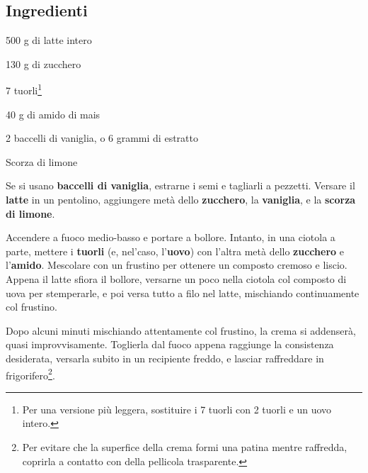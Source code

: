 \newpage
{}

\subsection*{Ingredienti}
\begin{ingredients}
	\item 500 g di latte intero
	\item 130 g di zucchero
	\item 7 tuorli\footnote{Per una versione più leggera, sostituire i 7 tuorli con 2 tuorli e un uovo intero.}
	\item 40 g di amido di mais
	\item 2 baccelli di vaniglia, o 6 grammi di estratto
	\item Scorza di  limone
\end{ingredients}

\medskip

Se si usano \textbf{baccelli di vaniglia}, estrarne i semi e tagliarli a pezzetti.
Versare il \textbf{latte} in un pentolino, aggiungere metà dello \textbf{zucchero}, la \textbf{vaniglia}, e la \textbf{scorza di limone}.

Accendere a fuoco medio-basso e portare a bollore.
Intanto, in una ciotola a parte, mettere i \textbf{tuorli} (e, nel'caso, l'\textbf{uovo}) con l'altra metà dello \textbf{zucchero} e l'\textbf{amido}.
Mescolare con un frustino per ottenere un composto cremoso e liscio.
Appena il latte sfiora il bollore, versarne un poco nella ciotola col composto di uova per stemperarle, e poi versa tutto a filo nel latte, mischiando continuamente col frustino. 

Dopo alcuni minuti mischiando attentamente col frustino, la crema si addenserà, quasi improvvisamente. 
Toglierla dal fuoco appena raggiunge la consistenza desiderata, versarla subito in un recipiente freddo, e lasciar raffreddare in frigorifero\footnote{Per evitare che la superfice della crema formi una patina mentre raffredda, coprirla a contatto con della pellicola trasparente.}.


\vspace*{0.75 cm}

\begin{recipeblock}
	
\end{recipeblock}